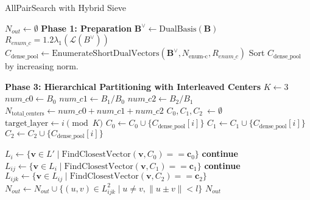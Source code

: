 \documentclass{article}
\begin{document}
\begin{algorithm}[H]
\caption{AllPairSearch with Hybrid Sieve} \label{alg:hybrid_sieve_final}
\begin{algorithmic}[1]
\State $N_{out} \gets \emptyset$
\Statex
\Statex \textbf{Phase 1: Preparation}
\State $\mathbf{B}^{\vee} \gets \text{DualBasis}(\mathbf{B})$
\State $R_{enum\_c}=1.2\lambda _1(\mathcal{L}(B^\vee)) $
\State $C_{\text{dense\_pool}} \gets \text{EnumerateShortDualVectors}(\mathbf{B}^{\vee}, N_{\text{enum-c}}, R_{enum\_c})$
\State Sort $C_{\text{dense\_pool}}$ by increasing norm.
\Statex

\Statex \textbf{Phase 3: Hierarchical Partitioning with Interleaved Centers}
\State $K \gets 3$ 
\State $num\_c0 \gets B_0$
\State $num\_c1 \gets B_1 / B_0$
\State $num\_c2 \gets B_2 / B_1$
\State $N_{\text{total\_centers}} \gets num\_c0 + num\_c1 + num\_c2$
\Statex
\State $C_0, C_1, C_2\ \gets \emptyset$ 
    \State $\text{target\_layer} \gets i \pmod K$ 
        \State $C_0 \gets C_0 \cup \{C_{\text{dense\_pool}}[i]\}$
        \State $C_1 \gets C_1 \cup \{C_{\text{dense\_pool}}[i]\}$
        \State $C_2 \gets C_2 \cup \{C_{\text{dense\_pool}}[i]\}$
    \EndIf
\EndFor
\Statex

    \State $L_i \gets \{\mathbf{v} \in L' \mid \text{FindClosestVector}(\mathbf{v}, C_0) == \mathbf{c}_0\}$
     \textbf{continue} \EndIf
        \State $L_{ij} \gets \{\mathbf{v} \in L_i \mid \text{FindClosestVector}(\mathbf{v}, C_1) == \mathbf{c}_1\}$
         \textbf{continue} \EndIf
            \State $L_{ijk} \gets \{\mathbf{v} \in L_{ij} \mid \text{FindClosestVector}(\mathbf{v}, C_2) == \mathbf{c}_2\}$
                \State $N_{out} \gets N_{out} \cup \{ (u, v) \in L_{ijk}^2 \mid u \neq v, \|u \pm v\| < l \}$
            \EndIf
        \EndFor
    \EndFor
\EndFor
\State \Return $N_{out}$


\end{algorithmic}
\end{algorithm}
\end{document}
